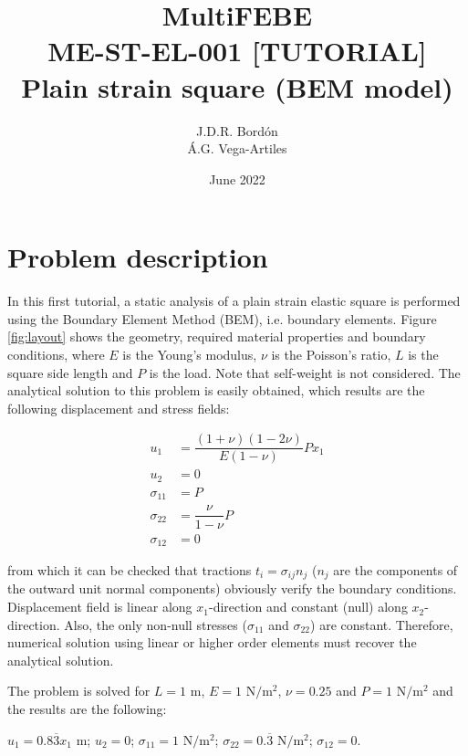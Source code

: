 \documentclass[A4]{article}
\title{MultiFEBE \\ ME-ST-EL-001 [TUTORIAL] \\ Plain strain square (BEM model)}
\author{J.D.R. Bord\'on\\ \'A.G. Vega-Artiles}
\date{June 2022}
\begin{document}
\maketitle

\tableofcontents 

\section{Problem description}

In this first tutorial, a static analysis of a plain strain elastic square is performed using the Boundary Element Method (BEM), i.e. boundary elements. Figure \ref{fig:layout} shows the geometry, required material properties and boundary conditions, where $E$ is the Young's modulus, $\nu$ is the Poisson's ratio, $L$ is the square side length and $P$ is the load. Note that self-weight is not considered. The analytical solution to this problem is easily obtained, which results are the following displacement and stress fields:

\begin{align}
u_1 &= \dfrac{(1+\nu)(1-2\nu)}{E(1-\nu)} P x_1 \\
u_2 &= 0 \\
\sigma_{11} &= P \\
\sigma_{22} &= \dfrac{\nu}{1-\nu}P \\
\sigma_{12} &= 0
\end{align}

from which it can be checked that tractions $t_i=\sigma_{ij}n_j$ ($n_j$ are the components of the outward unit normal components) obviously verify the boundary conditions. Displacement field is linear along $x_1$-direction and constant (null) along $x_2$-direction. Also, the only non-null stresses ($\sigma_{11}$ and $\sigma_{22}$) are constant. Therefore, numerical solution using linear or higher order elements must recover the analytical solution.

The problem is solved for $L=1$ $\mathrm{m}$, $E=1$ $\mathrm{N/m^2}$, $\nu=0.25$  and $P=1$ $\mathrm{N/m^2}$ and the results are the following:

	$u_1 = 0.8\overline{3} x_1$ $\mathrm{m}$;
	$u_2 = 0$;
	$\sigma_{11} = 1$ $\mathrm{N/m^2}$;
	$\sigma_{22} = 0.\overline{3}$ $\mathrm{N/m^2}$;
	$\sigma_{12} = 0$.
\end{document}
